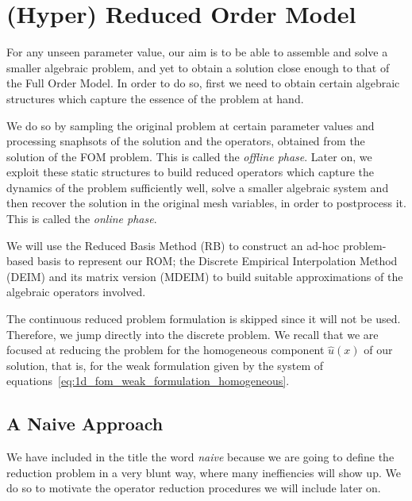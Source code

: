 \documentclass[../../thesis.tex]{subfiles}
\begin{document}
\section{(Hyper) Reduced Order Model}
\label{sec:rom_definition}
For any unseen parameter value, our aim is to be able to assemble and solve a smaller algebraic problem, 
and yet to obtain a solution close enough to that of the Full Order Model.
In order to do so, first we need to obtain certain algebraic structures which capture the essence of the problem at hand.

We do so by sampling the original problem at certain parameter values and processing snaphsots of the solution and the operators, obtained from the solution of the FOM problem.
This is called the \emph{offline phase}.
Later on, we exploit these static structures to build reduced operators which capture the dynamics of the problem sufficiently well, solve a smaller algebraic system and then recover the solution in the original mesh variables, in order to postprocess it.
This is called the \emph{online phase}.


We will use the Reduced Basis Method (RB) to construct an ad-hoc problem-based basis to represent our ROM;
the Discrete Empirical Interpolation Method (DEIM) and its matrix version (MDEIM) 
to build suitable approximations of the algebraic operators involved. 

The continuous reduced problem formulation is skipped since it will not be used. 
Therefore, we jump directly into the discrete problem.
We recall that we are focused at reducing the problem for 
the homogeneous component $\hat{u}(x)$ of our solution, 
that is, for the weak formulation given by the system of equations~\eqref{eq:1d_fom_weak_formulation_homogeneous}.  

\subsection{A Naive Approach}
We have included in the title the word \emph{naive} because we are going to define the reduction problem in a very blunt way,
where many ineffiencies will show up.
We do so to motivate the operator reduction procedures we will include later on.
\end{document}
